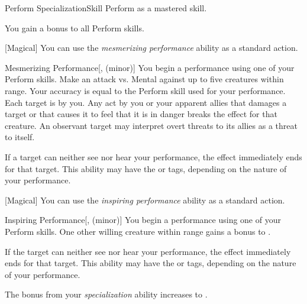     \begin{feat}{Perform Specialization}{Skill}
        \featpre Perform as a mastered skill.

         You gain a  bonus to all Perform skills.

        [Magical] You can use the \textit{mesmerizing performance} ability as a standard action.
        \begin{apability}{Mesmerizing Performance}[,  (minor)]
            You begin a performance using one of your Perform skills.
            Make an attack vs. Mental against up to five creatures within \rngmed range.
            Your accuracy is equal to the Perform skill used for your performance.
            \hit Each target is \fascinated by you.
            Any act by you or your apparent allies that damages a target or that causes it to feel that it is in danger breaks the effect for that creature.
            An observant target may interpret overt threats to its allies as a threat to itself.

            If a target can neither see nor hear your performance, the effect immediately ends for that target.
            This ability may have the  or  tags, depending on the nature of your performance.
        \end{apability}

        [Magical] You can use the \textit{inspiring performance} ability as a standard action.
        \begin{apability}{Inspiring Performance}[,  (minor)]
            You begin a performance using one of your Perform skills.
            One other willing creature within \rngmed range gains a  bonus to .

            If the target can neither see nor hear your performance, the effect immediately ends for that target.
            This ability may have the  or  tags, depending on the nature of your performance.
        \end{apability}

         The bonus from your \textit{specialization} ability increases to .


\end{feat}

